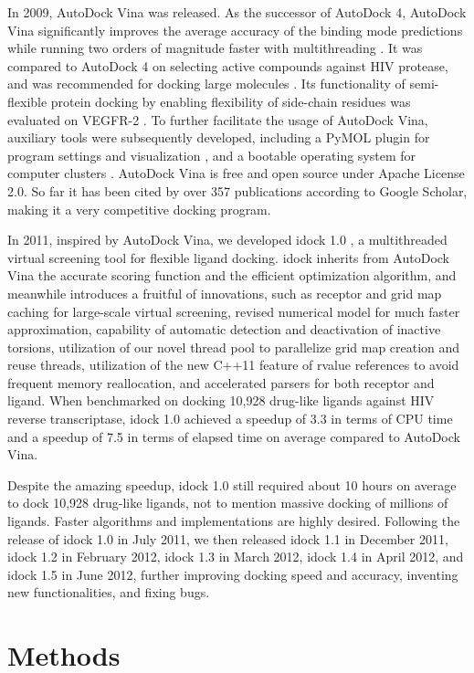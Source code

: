 In 2009, AutoDock Vina \citep{595} was released. As the successor of AutoDock 4, AutoDock Vina significantly improves the average accuracy of the binding mode predictions while running two orders of magnitude faster with multithreading \citep{595}. It was compared to AutoDock 4 on selecting active compounds against HIV protease, and was recommended for docking large molecules \citep{556}. Its functionality of semi-flexible protein docking by enabling flexibility of side-chain residues was evaluated on VEGFR-2 \citep{1084}. To further facilitate the usage of AutoDock Vina, auxiliary tools were subsequently developed, including a PyMOL plugin for program settings and visualization \citep{609}, and a bootable operating system for computer clusters \citep{773}. AutoDock Vina is free and open source under Apache License 2.0. So far it has been cited by over 357 publications according to Google Scholar, making it a very competitive docking program.

In 2011, inspired by AutoDock Vina, we developed idock 1.0 \citep{1153}, a multithreaded virtual screening tool for flexible ligand docking. idock inherits from AutoDock Vina the accurate scoring function and the efficient optimization algorithm, and meanwhile introduces a fruitful of innovations, such as receptor and grid map caching for large-scale virtual screening, revised numerical model for much faster approximation, capability of automatic detection and deactivation of inactive torsions, utilization of our novel thread pool to parallelize grid map creation and reuse threads, utilization of the new C++11 feature of rvalue references to avoid frequent memory reallocation, and accelerated parsers for both receptor and ligand. When benchmarked on docking 10,928 drug-like ligands against HIV reverse transcriptase, idock 1.0 achieved a speedup of 3.3 in terms of CPU time and a speedup of 7.5 in terms of elapsed time on average compared to AutoDock Vina.

Despite the amazing speedup, idock 1.0 still required about 10 hours on average to dock 10,928 drug-like ligands, not to mention massive docking of millions of ligands. Faster algorithms and implementations are highly desired. Following the release of idock 1.0 in July 2011, we then released idock 1.1 in December 2011, idock 1.2 in February 2012, idock 1.3 in March 2012, idock 1.4 in April 2012, and idock 1.5 in June 2012, further improving docking speed and accuracy, inventing new functionalities, and fixing bugs.

\section{Methods}

